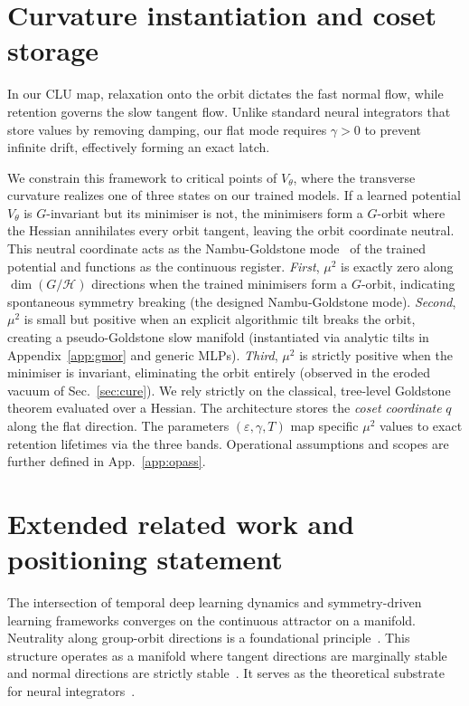 \documentclass[mlabstract,onecolumn]{jmlr}
\begin{document}
\section{Curvature instantiation and coset storage}\label{app:curcos}
In our CLU map, relaxation onto the orbit dictates the fast normal flow, while retention governs the slow tangent flow. Unlike standard neural integrators that store values by removing damping, our flat mode requires $\gamma>0$ to prevent infinite drift, effectively forming an exact latch.

We constrain this framework to critical points of $V_\theta$, where the transverse curvature realizes one of three states on our trained models. If a learned potential $V_\theta$ is $G$-invariant but its minimiser is not, the minimisers form a $G$-orbit where the Hessian annihilates every orbit tangent, leaving the orbit coordinate neutral. This neutral coordinate acts as the Nambu-Goldstone mode~\citep{watanabe_counting_2020,minami_spontaneous_2018} of the trained potential and functions as the continuous register. \emph{First}, $\mu^2$ is exactly zero along $\dim(G/\mathcal H)$ directions when the trained minimisers form a $G$-orbit, indicating spontaneous symmetry breaking (the designed Nambu-Goldstone mode). \emph{Second}, $\mu^2$ is small but positive when an explicit algorithmic tilt breaks the orbit, creating a pseudo-Goldstone slow manifold (instantiated via analytic tilts in Appendix~\ref{app:gmor} and generic MLPs). \emph{Third}, $\mu^2$ is strictly positive when the minimiser is invariant, eliminating the orbit entirely (observed in the eroded vacuum of Sec.~\ref{sec:cure}). We rely strictly on the classical, tree-level Goldstone theorem evaluated over a Hessian. The architecture stores the \emph{coset coordinate} $q$ along the flat direction. The parameters $(\varepsilon,\gamma,T)$ map specific $\mu^2$ values to exact retention lifetimes via the three bands. Operational assumptions and scopes are further defined in App.~\ref{app:opass}.

\section{Extended related work and positioning statement}
\label{app:relpos}
The intersection of temporal deep learning dynamics and symmetry-driven learning frameworks converges on the continuous attractor on a manifold. Neutrality along group-orbit directions is a foundational principle~\citep{golubitsky_singularities_1988,krupa_bifurcations_1990,rumberger_lyapunov_2001}. This structure operates as a manifold where tangent directions are marginally stable and normal directions are strictly stable~\citep{sagodi_back_2025}. It serves as the theoretical substrate for neural integrators~\citep{seung_how_1996}.
\end{document}
